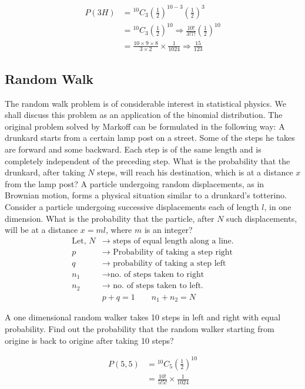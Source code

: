 \begin{answer}
	\begin{align*}
	P(3 H) &={ }^{10} C_{3}\left(\frac{1}{2}\right)^{10-3}\left(\frac{1}{2}\right)^{3} \\
	&={ }^{10} C_{3}\left(\frac{1}{2}\right)^{10} \Rightarrow \frac{10 !}{3 ! 7 !}\left(\frac{1}{2}\right)^{10}\\
	&=\frac{10 \times 9 \times 8}{3 \times 2} \times \frac{1}{1024} \Rightarrow \frac{15}{123}
	\end{align*}
\end{answer}


\subsection{Random Walk}
The random walk problem is of considerable interest in statistical physics. We shall discuss this problem as an application of the binomial distribution.
The original problem solved by Markoff can be formulated in the following way: A drunkard starts from a certain lamp post on a street. Some of the steps he takes are forward and some backward. Each step is of the same length and is completely independent of the preceding step. What is the probability that the drunkard, after taking $N$ steps, will reach his destination, which is at a distance $x$ from the lamp post?
A particle undergoing random displacements, as in Brownian motion, forms a physical situation similar to a drunkard's totterino.\\
Consider a particle undergoing successive displacements each of length $l$, in one dimension. What is the probability that the particle, after $N$ such displacements, will be at a distance $x=m l$, where $m$ is an integer?
\begin{align*}
\text{Let,  }N &\rightarrow\text{ steps of equal length along a line.}\\
p &\rightarrow\text{ Probability of taking a step right}\\
q &\rightarrow\text{ probability of taking a step left}\\
n_{1} &\rightarrow \text{no. of steps taken to right }\\
n_{2} &\rightarrow\text{ no. of steps taken to left.}\\
&p+q=1\qquad n_{1}+n_{2}=N
\end{align*}
\begin{exercise}
	A one dimensional random walker takes 10 steps in left and right with equal probability.  Find out the probability that the random walker starting from origine is back to origine after taking 10 steps?
\end{exercise}
\begin{answer}
	\begin{align*}
	P(5,5) &={ }^{10} C_{5}\left(\frac{1}{2}\right)^{10} \\
	&=\frac{10 !}{5 ! 5 !} \times \frac{1}{1024}
	\end{align*}
\end{answer}
